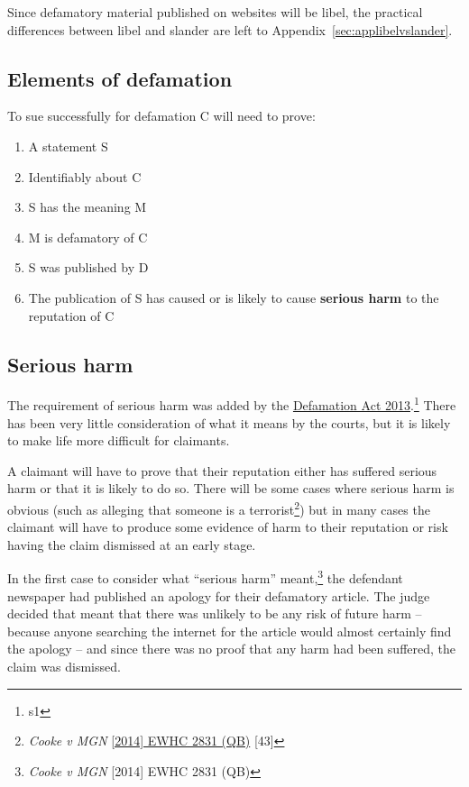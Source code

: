 \documentclass[]{article}
\begin{document}
Since defamatory material published on websites will be libel, the practical differences between libel and slander are left to Appendix~\ref{sec:applibelvslander}.

\subsection{Elements of defamation}

To sue successfully for defamation C will need to prove:

\begin{enumerate}
\item  A statement S
\item  Identifiably about C
\item  S has the meaning M
\item  M is defamatory of C
\item  S was published by D
\item The publication of S has caused or is likely to cause {\bf serious harm} to the reputation of C
\end{enumerate}

\subsection{Serious harm}
The requirement of serious harm was added by the \href{http://www.legislation.gov.uk/ukpga/2013/26/contents/enacted}{Defamation Act 2013}.\footnote{s1} There has been very little consideration of what it means by the courts, but it is likely to make life more difficult for claimants.

A claimant will have to prove that their reputation either has suffered serious harm or that it is likely to do so. There will be some cases where serious harm is obvious (such as alleging that someone is a terrorist\footnote{{\protect\it Cooke v MGN} \href{http://www.bailii.org/ew/cases/EWHC/QB/2014/2831.html}{[2014] EWHC 2831 (QB)} [43]}) but in many cases the claimant will have to produce some evidence of harm to their reputation or risk having the claim dismissed at an early stage.

In the first case to consider what ``serious harm'' meant,\footnote{{\protect\it Cooke v MGN} {[2014] EWHC 2831 (QB)}} the defendant newspaper had published an apology for their defamatory article. The judge decided that meant that there was unlikely to be any risk of future harm -- because anyone searching the internet for the article would almost certainly find the apology -- and since there was no proof that any harm had been suffered, the claim was dismissed.
\end{document}
